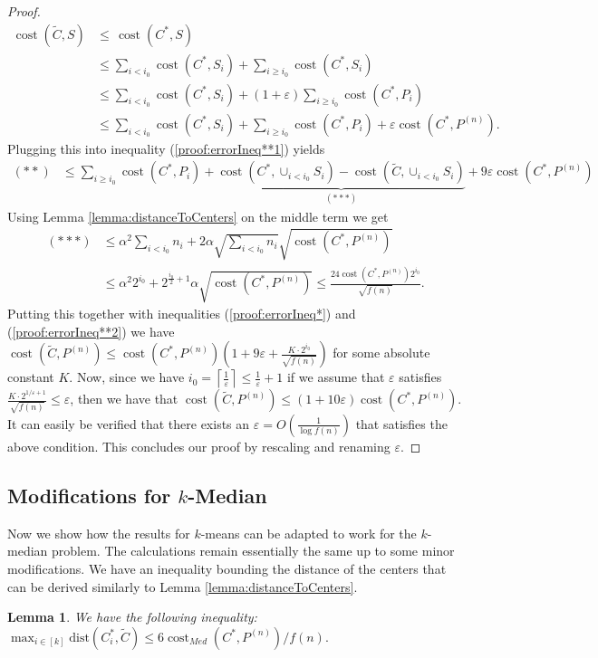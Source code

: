 \documentclass[a4paper,11pt,oneside,english,onecolumn]{article}
\newtheorem{lemma}[theorem]{Lemma}
\theoremstyle{definition}
\newcommand{\dist}[0]{\ensuremath{\mathrm{dist}}}
\DeclareMathOperator{\cost}{cost}
\newcommand{\ceil}[1]{\left \lceil #1 \right \rceil}
\newcommand{\eps}{\ensuremath{\varepsilon}}
\begin{document}
\begin{proof}
\begin{align*}
\cost(\tilde C, S) &\leq \, \cost(C^*,S) \\
	&\leq \sum_{i < i_0} \cost(C^*, S_i) + \sum_{i \geq i_0} \cost(C^*, S_i)\\&\leq \sum_{i < i_0} \cost(C^*, S_i) + (1 + \eps) \sum_{i \geq i_0} \cost(C^*, P_i) \\&\leq \sum_{i < i_0} \cost(C^*, S_i) + \sum_{i \geq i_0} \cost(C^*, P_i) + \eps \cost(C^*,P^{(n)}).
\end{align*}
Plugging this into inequality (\ref{proof:errorIneq**1}) yields
\begin{align}
(**) &\leq \sum_{i \geq i_0} \cost(C^*, P_i) + \underbrace{\cost(C^*, \cup_{i < i_ 0}S_i) - \cost(\tilde C, \cup_{i < i_0}S_i)}_{(***)} + 9\eps \cost(C^*, P^{(n)}) \label{proof:errorIneq**2}
\end{align}
Using Lemma \ref{lemma:distanceToCenters} on the middle term we get
\begin{align*}
(***) &\leq \alpha^2 \sum_{i < i_0} n_i  + 2\alpha \sqrt{\sum_{i < i_0}n_i}\sqrt{\cost(C^*, P^{(n)})} \\
&\leq \alpha^2 2^{i_0} +2^{\frac{i_0}{2}+1}\alpha \sqrt{\cost(C^*, P^{(n)})}  \leq \frac{24 \cost(C^*, P^{(n)}) 2^{i_0}}{\sqrt{f(n)}}.
\end{align*}
Putting this together with inequalities (\ref{proof:errorIneq*}) and (\ref{proof:errorIneq**2}) we have
$\cost(\tilde C, P^{(n)}) \leq \cost(C^*, P^{(n)})( 1+ 9 \eps + \frac{K \cdot 2^{i_0}}{\sqrt{f(n)}})$ for some absolute constant $K$.
Now, since we have $i_0 = \ceil{\frac{1}{\eps}} \leq \frac{1}{\eps} + 1$ if we assume that $ \eps$ satisfies $\frac{K \cdot 2^{1/\eps +1}}{\sqrt{f(n)}} \leq \eps$, then we have that $\cost(\tilde C, P^{(n)}) \leq (1 + 10 \eps) \cost(C^*, P^{(n)})$. It can easily be verified that there exists an $\eps = O(\frac{1}{\log f(n)})$ that satisfies the above condition. This concludes our proof by rescaling and renaming $\eps$.
\end{proof}

\subsection{Modifications for $k$-Median}
Now we show how the results for $k$-means can be adapted to work for the $k$-median problem. The calculations remain essentially the same up to some minor modifications. We have an inequality bounding the distance of the centers that can be derived similarly to Lemma \ref{lemma:distanceToCenters}.
\begin{lemma}
We have the following inequality: $\max_{i \in [k]} \dist(C^*_i, \tilde C) \leq 6\cost_{Med}(C^*, P^{(n)})/f(n).$
\end{lemma}
\end{document}
